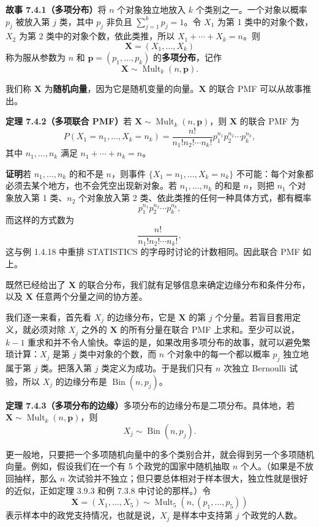 \documentclass[UTF8, 12pt, fontset=fandol, oneside]{ctexart}
\begin{document}
\noindent\textbf{故事 7.4.1（多项分布）}\quad 将 $n$ 个对象独立地放入 $k$ 个类别之一。一个对象以概率 $p_j$ 被放入第 $j$ 类，其中 $p_j$ 非负且 $\sum_{j=1}^{k}p_j=1$。令 $X_1$ 为第 1 类中的对象个数，$X_2$ 为第 2 类中的对象个数，依此类推，所以 $X_1+\cdots+X_k=n$。则
\[
  \mathbf{X}=(X_1,\ldots,X_k)
\]
称为服从参数为 $n$ 和 $\mathbf{p}=(p_1,\ldots,p_k)$ 的\textbf{多项分布}，记作
\[
  \mathbf{X}\sim \operatorname{Mult}_k(n,\mathbf{p}).
\]

我们称 $\mathbf{X}$ 为\textbf{随机向量}，因为它是随机变量的向量。$\mathbf{X}$ 的联合 PMF 可以从故事推出。

\noindent\textbf{定理 7.4.2（多项联合 PMF）}\quad 若 $\mathbf{X}\sim \operatorname{Mult}_k(n,\mathbf{p})$，则 $\mathbf{X}$ 的联合 PMF 为
\[
  P(X_1=n_1,\ldots,X_k=n_k)
  =\frac{n!}{n_1!n_2!\cdots n_k!}p_1^{n_1}p_2^{n_2}\cdots p_k^{n_k},
\]
其中 $n_1,\ldots,n_k$ 满足 $n_1+\cdots+n_k=n$。

\noindent\textbf{证明}\quad 若 $n_1,\ldots,n_k$ 的和不是 $n$，则事件 $\{X_1=n_1,\ldots,X_k=n_k\}$ 不可能：每个对象都必须去某个地方，也不会凭空出现新对象。若 $n_1,\ldots,n_k$ 的和是 $n$，则把 $n_1$ 个对象放入第 1 类、$n_2$ 个对象放入第 2 类、依此类推的任何一种具体方式，都有概率
\[
  p_1^{n_1}p_2^{n_2}\cdots p_k^{n_k},
\]
而这样的方式数为
\[
  \frac{n!}{n_1!n_2!\cdots n_k!},
\]
这与例 1.4.18 中重排 STATISTICS 的字母时讨论的计数相同。因此联合 PMF 如上。

既然已经给出了 $\mathbf{X}$ 的联合分布，我们就有足够信息来确定边缘分布和条件分布，以及 $\mathbf{X}$ 任意两个分量之间的协方差。

我们逐一来看，首先看 $X_j$ 的边缘分布，它是 $\mathbf{X}$ 的第 $j$ 个分量。若盲目套用定义，就必须对除 $X_j$ 之外的 $\mathbf{X}$ 的所有分量在联合 PMF 上求和。至少可以说，$k-1$ 重求和并不令人愉快。幸运的是，如果改用多项分布的故事，就可以避免繁琐计算：$X_j$ 是第 $j$ 类中对象的个数，而 $n$ 个对象中的每一个都以概率 $p_j$ 独立地属于第 $j$ 类。把落入第 $j$ 类定义为成功。于是我们只有 $n$ 次独立 Bernoulli 试验，所以 $X_j$ 的边缘分布是 $\operatorname{Bin}(n,p_j)$。

\noindent\textbf{定理 7.4.3（多项分布的边缘）}\quad 多项分布的边缘分布是二项分布。具体地，若 $\mathbf{X}\sim \operatorname{Mult}_k(n,\mathbf{p})$，则
\[
  X_j\sim \operatorname{Bin}(n,p_j).
\]

更一般地，只要把一个多项随机向量中的多个类别合并，就会得到另一个多项随机向量。例如，假设我们在一个有 5 个政党的国家中随机抽取 $n$ 个人。（如果是不放回抽样，那么 $n$ 次试验并不独立；但只要总体相对于样本很大，独立性就是很好的近似，正如定理 3.9.3 和例 7.3.8 中讨论的那样。）令
\[
  \mathbf{X}=(X_1,\ldots,X_5)\sim \operatorname{Mult}_5(n,(p_1,\ldots,p_5))
\]
表示样本中的政党支持情况，也就是说，$X_j$ 是样本中支持第 $j$ 个政党的人数。
\end{document}
